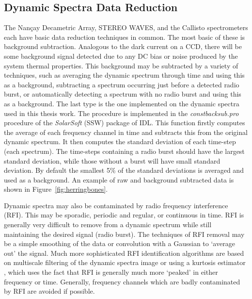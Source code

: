 \subsection{Dynamic Spectra Data Reduction}

The Nan\c{c}ay Decametric Array, STEREO WAVES, and the Callisto spectrometers each have basic data reduction techniques in common. The most basic of these is background subtraction. Analogous to the dark current on a CCD, there will be some background signal detected due to any DC bias or noise produced by the system thermal properties. This background may be subtracted by a variety of techniques, such as averaging the dynamic spectrum through time and using this as a background, subtracting a spectrum occurring just before a detected radio burst, or automatically detecting a spectrum with no radio burst and using this as a background. The last type is the one implemented on the dynamic spectra used in this thesis work. The procedure is implemented in the {\it constbacksub.pro} procedure of the \emph{SolarSoft} (SSW) package of IDL. This function firstly computes the average of each frequency channel in time and subtracts this from the original dynamic spectrum. It then computes the standard deviation of each time-step (each spectrum). The time-steps containing a radio burst should have the largest standard deviation, while those without a burst will have small standard deviation. By default the smallest  5\% of the standard deviations is averaged and used as a background. An example of raw and background subtracted data is shown in Figure~\ref{fig:herringbones}.

Dynamic spectra may also be contaminated by radio frequency interference (RFI). This may be sporadic, periodic and regular, or continuous in time. RFI is generally very difficult to remove from a dynamic spectrum while still maintaining the desired signal (radio burst). The techniques of RFI removal may be a simple smoothing of the data or convolution with a Gaussian to `average out' the signal. Much more sophisticated RFI identification algorithms are based on multiscale filtering of the dynamic spectra image or using a kurtosis estimator \citep{nita2007, nita2010}, which uses the fact that RFI is generally much more `peaked' in either frequency or time. Generally, frequency channels which are badly contaminated by RFI are avoided if possible.
